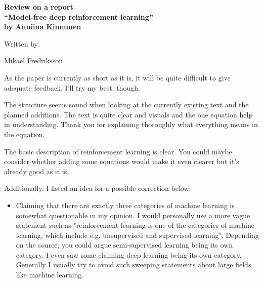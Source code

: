 \documentclass[a4paper,11pt]{article}
\begin{document}
\pagestyle{empty}


  \begin{center}
{\large {\bf 
Review on a report \\
``Model-free deep reinforcement learning'' \\
by Anniina Kinnunen} \\

\bigskip

Written by: 

Mikael Fredriksson
 } 
\end{center}

As the paper is currently as short as it is, it will be quite difficult to give 
adequate feedback. I'll try my best, though.

The structure seems sound when looking at the currently existing text and the planned
additions. The text is quite clear and visuals and the one equation help in understanding.
Thank you for explaining thoroughly what everything means in the equation.

The basic description of reinforcement learning is clear. You could maybe consider
whether adding some equations would make it even clearer but it's already good as it is.

Additionally, I listed an idea for a possible correction below:

\begin{itemize}
	
	\item Claiming that there are exactly three categories of machine learning 
		  is somewhat questionable in my opinion. I would personally use a more
		  vague statement such as "reinforcement learning is one of the categories of
		  machine learning, which include e.g. unsupervised and supervised learning".
		  Depending on the source, you could argue semi-supervised learning being its
		  own category. I even saw some claiming deep learning being its own category.
		  Generally I usually try to avoid such sweeping statements about large
		  fields like machine learning.

\end{itemize}
\end{document}
